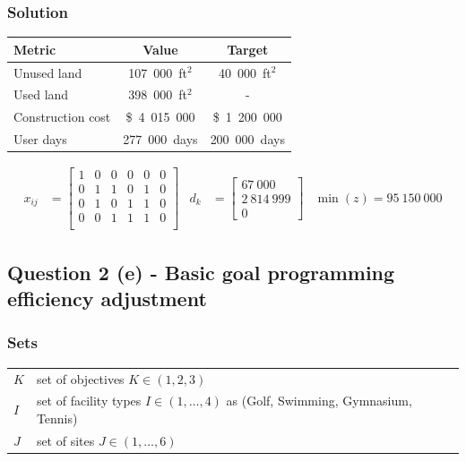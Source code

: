 \documentclass[a4paper,11pt]{article}
\begin{document}
\subsubsection{Solution}
\begin{center}
	\begin{tabular}{l c c}
		\hline
		\hline
		\textbf{Metric} & \textbf{Value} & \textbf{Target}\\
		\hline
		\hline
		Unused land & 107\ 000\ ft$^2$ & 40\ 000\ ft$^2$\\
		Used land & 398\ 000\ ft$^2$ & -\\
		Construction cost & \$\ 4\ 015\ 000 & \$\ 1\ 200\ 000 \\
		User days & 277\ 000\ days & 200\ 000\ days\\
		\hline
	\end{tabular}
\end{center}

\begin{align}
x_{ij} &= 
	\begin{bmatrix} 
    1  &  0  &  0  &  0  &  0  &  0 \\
    0  &  1  &  1  &  0  &  1  &  0 \\
    0  &  1  &  0  &  1  &  1  &  0 \\
    0  &  0  &  1  &  1  &  1  &  0 \\
	\end{bmatrix}
&d_k &= 	\begin{bmatrix} 
    67\ 000 \\
    2\ 814\ 999\\
    0 \end{bmatrix} & \min(z) = 95\ 150\ 000
\end{align}




\newpage
\subsection{Question 2 (e) - Basic goal programming efficiency adjustment}
\subsubsection{Sets}
\begin{tabular}{lll}
	$K$ & set of objectives $K \in (1,2,3)$\\
	$I$ & set of facility types $I \in (1,\dots,4)$ as (Golf, Swimming, Gymnasium, Tennis)\\
$J$ & set of sites $J \in (1,\dots, 6)$ 
\end{tabular}
\end{document}
